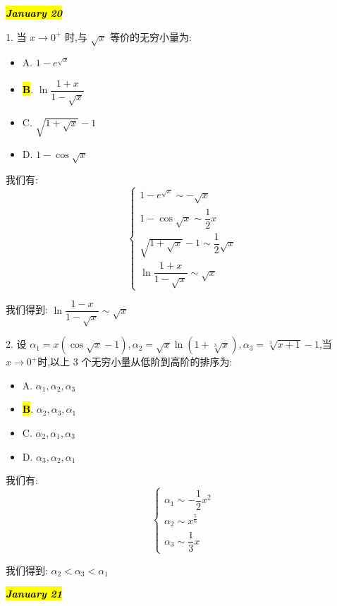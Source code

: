 \hl{\textbf{\textit{January 20}}}

1. 当 $x\to 0^{+}$ 时,与 $\sqrt{x}$ 等价的无穷小量为:
\begin{itemize}
	\item A. $1-e^{\sqrt{x}}$
	\item \hl{\textbf{B}}. $\ln\dfrac{1+x}{1-\sqrt{x}}$
	\item C. $\sqrt{1+\sqrt{x}}-1$
	\item D. $1-\cos \sqrt{x}$
\end{itemize}
\begin{solution}

	我们有:
	$$\begin{cases} 
		1-e^{\sqrt{x}}\sim -\sqrt{x}\\
		1-\cos\sqrt{x} \sim \dfrac{1}{2}x\\
		\sqrt{1+\sqrt{x}}-1 \sim \dfrac{1}{2}\sqrt{x}\\
		\ln\dfrac{1+x}{1-\sqrt{x}}\sim \sqrt{x}
	\end{cases}$$

	我们得到: $\ln \dfrac{1-x}{1-\sqrt{x}}\sim \sqrt{x}$
\end{solution}

2. 设 $\alpha_{1}=x(\cos\sqrt{x}-1),\alpha_{2}=\sqrt{x}\ln(1+\sqrt[3]{x}),\alpha_{3}=\sqrt[3]{x+1}-1$,当 $x\to 0^{+}$时,以上 $3$ 个无穷小量从低阶到高阶的排序为:
\begin{itemize}
	\item A. $\alpha_{1},\alpha_{2},\alpha_{3}$
	\item \hl{\textbf{B}}. $\alpha_{2},\alpha_{3},\alpha_{1}$
	\item C. $\alpha_{2},\alpha_{1},\alpha_{3}$
	\item D. $\alpha_{3},\alpha_{2},\alpha_{1}$
\end{itemize}
\begin{solution}

	我们有:
	$$\begin{cases}
		\alpha_{1}\sim -\dfrac{1}{2}x^{2}\\
		\alpha_{2}\sim x^{\frac{5}{6}}\\
		\alpha_{3}\sim \dfrac{1}{3}x
	\end{cases}$$

	我们得到: $\alpha_{2} < \alpha_{3} < \alpha_{1}$
\end{solution}

\hl{\textbf{\textit{January 21}}}

